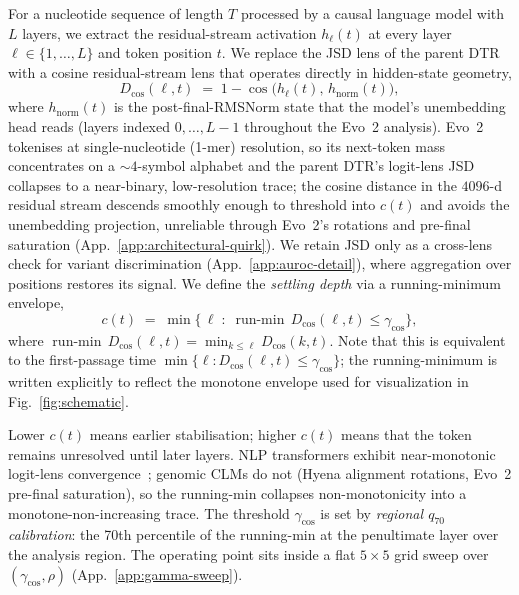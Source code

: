 \documentclass{article}
\theoremstyle{plain}
\theoremstyle{definition}
\theoremstyle{remark}
\newcommand{\hl}{h_{\ell}}
\newcommand{\hnorm}{h_{\mathrm{norm}}}
\newcommand{\Dcos}{D_{\cos}}
\newcommand{\runmin}{\operatorname{run\text{-}min}}
\begin{document}
For a nucleotide sequence of length $T$ processed by a causal language model with $L$ layers, we extract the residual-stream activation $\hl(t)$ at every layer $\ell\!\in\!\{1,\ldots,L\}$ and token position $t$. We replace the JSD lens of the parent DTR~\cite{chen2026deepthinking} with a cosine residual-stream lens that operates directly in hidden-state geometry,
\begin{equation}
  \Dcos(\ell, t) \;=\; 1 - \cos\!\bigl(\hl(t),\, \hnorm(t)\bigr),
  \label{eq:cos-lens}
\end{equation}
where $\hnorm(t)$ is the post-final-RMSNorm state that the model's unembedding head reads (layers indexed $0,\ldots,L\!-\!1$ throughout the Evo~2 analysis).
Evo~2 tokenises at single-nucleotide (1-mer) resolution, so its next-token mass concentrates on a $\sim\!4$-symbol alphabet and the parent DTR's logit-lens JSD collapses to a near-binary, low-resolution trace; the cosine distance in the $4096$-d residual stream descends smoothly enough to threshold into $c(t)$ and avoids the unembedding projection, unreliable through Evo~2's rotations and pre-final saturation (App.~\ref{app:architectural-quirk}). We retain JSD only as a cross-lens check for variant discrimination (App.~\ref{app:auroc-detail}), where aggregation over positions restores its signal. We define the \emph{settling depth} via a running-minimum envelope,
\begin{equation}
  c(t) \;=\; \min\bigl\{\, \ell \;:\; \runmin\,\Dcos(\ell, t) \le \gamma_{\cos}\bigr\},
  \label{eq:settling}
\end{equation}
where $\runmin\,\Dcos(\ell,t) = \min_{k\le\ell}\Dcos(k,t)$. Note that this is equivalent to the first-passage time $\min\{\ell : D_{\cos}(\ell, t) \leq \gamma_{\cos}\}$; the running-minimum is written explicitly to reflect the monotone envelope used for visualization in Fig.~\ref{fig:schematic}.

Lower $c(t)$ means earlier stabilisation; higher $c(t)$ means that the token remains unresolved until later layers. NLP transformers exhibit near-monotonic logit-lens convergence~\cite{nostalgebraist2020logitlens,belrose2023tunedlens}; genomic CLMs do not (Hyena alignment rotations, Evo~2 pre-final saturation), so the running-min collapses non-monotonicity into a monotone-non-increasing trace. The threshold $\gamma_{\cos}$ is set by \emph{regional $q_{70}$ calibration}: the 70th percentile of the running-min at the penultimate layer over the analysis region. The operating point sits inside a flat $5\!\times\!5$ grid sweep over $(\gamma_{\cos},\rho)$ (App.~\ref{app:gamma-sweep}).
\end{document}
